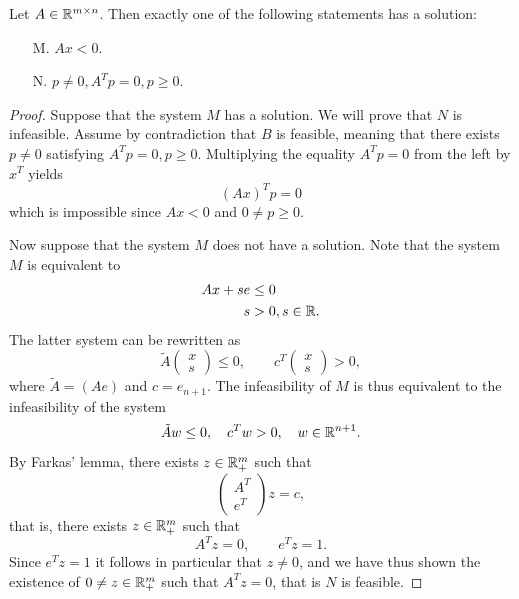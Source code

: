 \documentclass[10pt,a4paper]{article}
\begin{document}
\begin{theorem}\label{thm:gordon}
	Let $A\in\mathbb{R}^{m\times n}$. Then exactly one of the following statements has a solution:
	\begin{itemize}
		\item[M.] $Ax<0$.
		\item[N.] $p\neq 0, A^Tp = 0, p\geq 0$.
	\end{itemize}
\end{theorem}
\begin{proof}
	Suppose that the system $M$ has a solution. We will prove that $N$ is infeasible. Assume by contradiction that $B$ is feasible, meaning that there exists $p\neq0$ satisfying $A^Tp=0, p\geq0$. Multiplying the equality $A^Tp=0$ from the left by $x^T$ yields 
	\begin{equation*}
		(Ax)^Tp=0
	\end{equation*}
which is impossible since $Ax<0$ and $0\neq p\geq0$.
\par Now suppose that the system $M$ does not have a solution. Note that the system $M$ is equivalent to 
\begin{align*}
	Ax+se&\leq 0\\
	s&>0, s\in \mathbb{R}. 
\end{align*}
The latter system can be rewritten as 
\begin{equation*}
	\tilde{A}\begin{pmatrix}
		x\\
		s
	\end{pmatrix}\leq 0, \qquad c^T\begin{pmatrix}
	x\\
	s
\end{pmatrix}>0,
\end{equation*}
where $\tilde{A}=(A e)$ and $c=e_{n+1}$. The infeasibility of $M$ is thus equivalent to the infeasibility of the system 
\begin{equation*}
\tilde{A}w\leq 0, \quad c^Tw>0,\quad w\in \mathbb{R}^{n+1}.
\end{equation*}
By Farkas' lemma, there exists $z\in \mathbb{R}^{m}_+$ such that 
\begin{equation*}
	\begin{pmatrix}
		A^T\\
		e^T
	\end{pmatrix}z = c,
\end{equation*}
that is, there exists $z\in \mathbb{R}^m_+$ such that 
\begin{equation*}
	A^Tz=0, \qquad e^Tz=1.
\end{equation*}
Since $ e^Tz=1$ it follows in particular that $z\neq 0$, and we have thus shown the existence of $0\neq z \in \mathbb{R}^m_+$ such that $A^Tz=0$, that is $N$ is feasible.
\end{proof}
\end{document}
